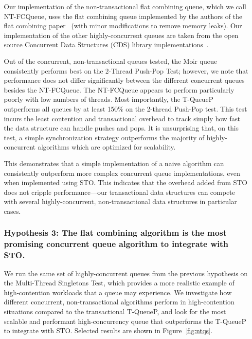Our implementation of the non-transactional flat combining queue, which we call NT-FCQueue, uses the flat combining queue implemented by the authors of the flat combining paper~\cite{flatcombining} (with minor modifications to remove memory leaks). Our implementation of the other highly-concurrent queues are taken from the open source Concurrent Data Structures (CDS) library implementations~\cite{libcds}. 

Out of the concurrent, non-transactional queues tested, the Moir queue~\cite{queue2} consistently performs best on the 2-Thread Push-Pop Test; however, we note that performance does not differ significantly between the different concurrent queues besides the NT-FCQueue. The NT-FCQueue appears to perform particularly poorly with low numbers of threads. Most importantly, the T-QueueP outperforms all queues by at least 150\% on the 2-thread Push-Pop test. This test incurs the least contention and transactional overhead to track simply how fast the data structure can handle pushes and pops. It is unsurprising that, on this test, a simple synchronization strategy outperforms the majority of highly-concurrent algorithms which are optimized for scalability. 

This demonstrates that a simple implementation of a naive algorithm can consistently outperform more complex concurrent queue implementations, even when implemented using STO. This indicates that the overhead added from STO does not cripple performance---our transactional data structures can compete with several highly-concurrent, non-transactional data structures in particular cases. 

\vspace{12pt}
\noindent{}

\subsubsection{Hypothesis 3: The flat combining algorithm is the most promising concurrent queue algorithm to integrate with STO.}
\label{eval:hypo3}

We run the same set of highly-concurrent queues from the previous hypothesis on the Multi-Thread Singletons Test, which provides a more realistic example of high-contention workloads that a queue may experience. We investigate how different concurrent, non-transactional algorithms perform in high-contention situations compared to the transactional T-QueueP, and look for the most scalable and performant high-concurrency queue that outperforms the T-QueueP to integrate with STO. Selected results are shown in Figure~\ref{fig:ntqs}.

